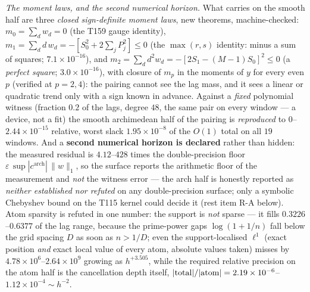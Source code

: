 \documentclass[11pt,a4paper]{article}
\begin{document}
\emph{The moment laws, and the second numerical horizon.} What carries on the
smooth half are three \emph{closed sign-definite moment laws}, new theorems,
machine-checked: $m_0=\sum_d w_d=0$ (the T159 gauge identity), $m_1=\sum_d
d\,w_d=-[S_0^2+2\sum_jP_j^2]\le0$ (the $\max(r,s)$ identity: minus a sum of
squares; $7.1\times10^{-16}$), and $m_2=\sum_d d^2w_d=-[2S_1-(M-1)S_0]^2\le0$ (a
\emph{perfect square}; $3.0\times10^{-16}$), with closure of $m_p$ in the moments
of $y$ for every even $p$ (verified at $p=2,4$): the pairing cannot see the lag
mass, and it sees a linear or quadratic trend only with a sign known in advance.
Against a \emph{fixed} polynomial witness (fraction $0.2$ of the lags, degree
$48$, the same pair on every window --- a device, not a fit) the smooth
archimedean half of the pairing is \emph{reproduced} to $0$--$2.44\times10^{-15}$
relative, worst slack $1.95\times10^{-8}$ of the $O(1)$ total on all $19$
windows. And a \textbf{second numerical horizon is declared} rather than hidden:
the measured residual is $4.12$--$428$ times the double-precision floor
$\varepsilon\,\sup|c^{\mathrm{arch}}|\,\|w\|_1$, so the surface reports the
arithmetic floor of the measurement and \emph{not} the witness error --- the arch
half is honestly reported as \emph{neither established nor refuted} on any
double-precision surface; only a symbolic Chebyshev bound on the T115 kernel
could decide it (rest item R-A below). Atom sparsity is refuted in one number:
the support is \emph{not} sparse --- it fills $0.3226$--$0.6377$ of the lag range,
because the prime-power gaps $\log(1+1/n)$ fall below the grid spacing $D$ as
soon as $n>1/D$; even the support-localised $\ell^1$ (exact position \emph{and}
exact local value of every atom, absolute values taken) misses by
$4.78\times10^{6}$--$2.64\times10^{9}$ growing as $h^{+3.505}$, while the required
relative precision on the atom half is the cancellation depth itself,
$|{\rm total}|/|{\rm atom}|=2.19\times10^{-6}$--$1.12\times10^{-4}\sim h^{-2}$.
\end{document}
